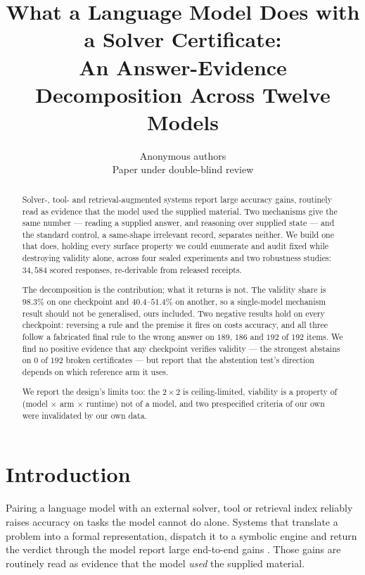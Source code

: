 \documentclass[10pt,twocolumn]{article}
\title{What a Language Model Does with a Solver Certificate:\\
An Answer-Evidence Decomposition Across Twelve Models}
\author{Anonymous authors\\Paper under double-blind review}
\date{}
\begin{document}
\maketitle

\begin{abstract}
Solver-, tool- and retrieval-augmented systems report large accuracy gains,
routinely read as evidence that the model used the supplied material. Two
mechanisms give the same number --- reading a supplied answer, and reasoning over
supplied state --- and the standard control, a same-shape irrelevant record,
separates neither. We build one that does, holding every surface property we could enumerate
and audit fixed
while destroying validity alone, across four sealed experiments and two
robustness studies: $34{,}584$ scored responses, re-derivable from
released receipts.

The decomposition is the contribution; what it returns is not. The validity
share is $98.3\%$ on one checkpoint and $40.4$--$51.4\%$ on another, so a
single-model mechanism result should not be generalised, ours included. Two
negative results hold on every checkpoint: reversing a rule and the premise it
fires on costs accuracy, and all three follow a fabricated final rule to the wrong answer on $189$, $186$
and $192$ of $192$ items. We
find no positive evidence that any checkpoint verifies validity --- the strongest
abstains on $0$ of $192$ broken certificates --- but report that the abstention
test's direction depends on which reference arm it uses.

We report the design's limits too: the $2\times2$ is ceiling-limited, viability
is a property of (model $\times$ arm $\times$ runtime) not of a model, and two
prespecified criteria of our own were invalidated by our own data.
\end{abstract}

\section{Introduction}

Pairing a language model with an external solver, tool or retrieval index
reliably raises accuracy on tasks the model cannot do alone. Systems that translate a problem into a formal representation, dispatch it to a
symbolic engine and return the verdict through the model report large end-to-end
gains \citep{pan2023logiclm,olausson2023linc,ye2023satlm,gao2022pal,schick2023toolformer,yang2023leandojo,lewis2020retrievalaugmented}.
Those gains are routinely read as evidence that the model \emph{used} the
supplied material.
\end{document}
